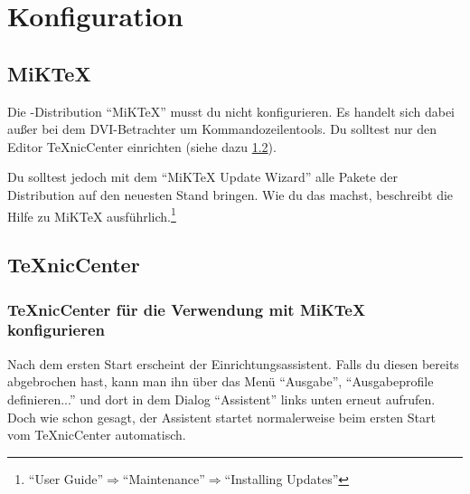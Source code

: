 %
%

\chapter{Konfiguration}

\section{MiKTeX}

Die \DMLLaTeX-Distribution \enquote{MiKTeX} musst du nicht konfigurieren. Es handelt sich dabei außer bei dem DVI-Betrachter um Kommandozeilentools. Du solltest nur den Editor TeXnicCenter einrichten (siehe dazu \ref{sec:KonfigurationTeXnicCenter}).

Du solltest jedoch mit dem \enquote{MiKTeX Update Wizard} alle Pakete der Distribution auf den neuesten Stand bringen. Wie du das machst, beschreibt die Hilfe zu MiKTeX ausführlich.\footnote{\enquote{User Guide}$\Rightarrow$\enquote{Maintenance}$\Rightarrow$\enquote{Installing Updates}}

\section{TeXnicCenter}
\label{sec:KonfigurationTeXnicCenter}

\subsection{TeXnicCenter für die Verwendung mit MiKTeX konfigurieren}

Nach dem ersten Start erscheint der Einrichtungsassistent. Falls du diesen bereits abgebrochen hast, kann man ihn über das Menü \enquote{Ausgabe}, \enquote{Ausgabeprofile definieren...} und dort in dem Dialog \enquote{Assistent} links unten erneut aufrufen. Doch wie schon gesagt, der Assistent startet normalerweise beim ersten Start vom TeXnicCenter automatisch.

